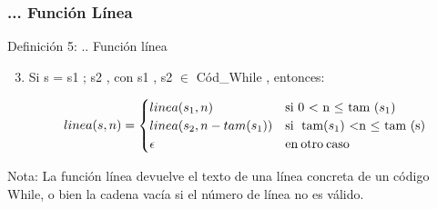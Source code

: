 \documentclass[xcolor=table]{beamer}
\begin{document}
\begin{frame}[fragile]\frametitle{... Función Línea} \footnotesize
\begin{block}{Definición 5: .. Función línea}
\end{block}

\begin{enumerate}
    \setcounter{enumi}{2}
    \item Si s = s1 ; s2 , con s1 , s2 $\in$ Cód\_While , entonces:

         \scriptsize\begin{equation*} linea(s,n) = 
            \begin{cases} 
                    linea(s_1,n)            & \text{si 0 < n $\leq$ tam ($s_1$)}\\
                    linea(s_2,n-tam(s_1))   & \text{si\; tam($s_1$) <n $\leq$ tam (s) }\\
                    \epsilon                & \text{en\:otro\:caso}
            \end{cases} \end{equation*}   
        
\end{enumerate}


Nota: La función línea devuelve el texto de una línea concreta de un código While, o bien la cadena vacía si el número de
línea no es válido.

\end{frame}
\end{document}
